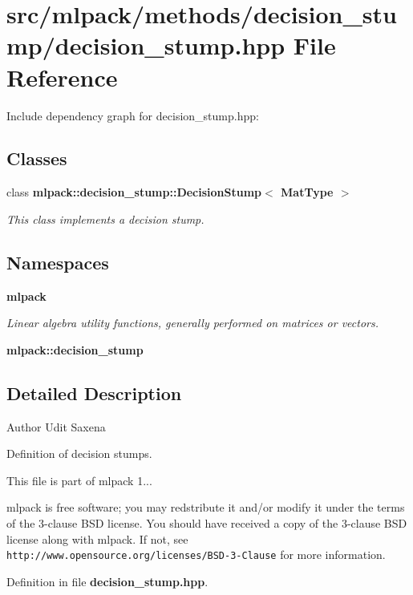 \section{src/mlpack/methods/decision\-\_\-stump/decision\-\_\-stump.hpp File Reference}
\label{decision__stump_8hpp}
Include dependency graph for decision\-\_\-stump.\-hpp\-:
\subsection*{Classes}
\begin{DoxyCompactItemize}
\item 
class {\bf mlpack\-::decision\-\_\-stump\-::\-Decision\-Stump$<$ Mat\-Type $>$}
\begin{DoxyCompactList}\small\item\em This class implements a decision stump. \end{DoxyCompactList}\end{DoxyCompactItemize}
\subsection*{Namespaces}
\begin{DoxyCompactItemize}
\item 
{\bf mlpack}
\begin{DoxyCompactList}\small\item\em Linear algebra utility functions, generally performed on matrices or vectors. \end{DoxyCompactList}\item 
{\bf mlpack\-::decision\-\_\-stump}
\end{DoxyCompactItemize}


\subsection{Detailed Description}
\begin{DoxyAuthor}{Author}
Udit Saxena
\end{DoxyAuthor}
Definition of decision stumps.

This file is part of mlpack 1...

mlpack is free software; you may redstribute it and/or modify it under the terms of the 3-\/clause B\-S\-D license. You should have received a copy of the 3-\/clause B\-S\-D license along with mlpack. If not, see {\tt http\-://www.\-opensource.\-org/licenses/\-B\-S\-D-\/3-\/\-Clause} for more information. 

Definition in file {\bf decision\-\_\-stump.\-hpp}.

